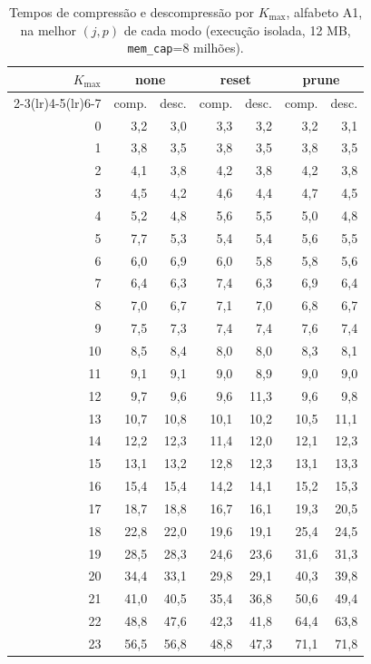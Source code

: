 \begin{table}[H]
\centering
\small
\caption{Tempos de compress\~ao e descompress\~ao por $K_{\max}$, alfabeto A1, na melhor $(j,p)$ de cada modo (execu\c{c}\~ao isolada, 12 MB, \texttt{mem\_cap}=8 milh\~oes).}
\label{tab:times-A1}
\begin{tabular}{rrrrrrr}
\toprule
$K_{\max}$ & \multicolumn{2}{c}{none} & \multicolumn{2}{c}{reset} & \multicolumn{2}{c}{prune} \\
\cmidrule(lr){2-3}\cmidrule(lr){4-5}\cmidrule(lr){6-7}
 & comp. & desc. & comp. & desc. & comp. & desc. \\
\midrule
0 & 3,2 & 3,0 & 3,3 & 3,2 & 3,2 & 3,1 \\
1 & 3,8 & 3,5 & 3,8 & 3,5 & 3,8 & 3,5 \\
2 & 4,1 & 3,8 & 4,2 & 3,8 & 4,2 & 3,8 \\
3 & 4,5 & 4,2 & 4,6 & 4,4 & 4,7 & 4,5 \\
4 & 5,2 & 4,8 & 5,6 & 5,5 & 5,0 & 4,8 \\
5 & 7,7 & 5,3 & 5,4 & 5,4 & 5,6 & 5,5 \\
6 & 6,0 & 6,9 & 6,0 & 5,8 & 5,8 & 5,6 \\
7 & 6,4 & 6,3 & 7,4 & 6,3 & 6,9 & 6,4 \\
8 & 7,0 & 6,7 & 7,1 & 7,0 & 6,8 & 6,7 \\
9 & 7,5 & 7,3 & 7,4 & 7,4 & 7,6 & 7,4 \\
10 & 8,5 & 8,4 & 8,0 & 8,0 & 8,3 & 8,1 \\
11 & 9,1 & 9,1 & 9,0 & 8,9 & 9,0 & 9,0 \\
12 & 9,7 & 9,6 & 9,6 & 11,3 & 9,6 & 9,8 \\
13 & 10,7 & 10,8 & 10,1 & 10,2 & 10,5 & 11,1 \\
14 & 12,2 & 12,3 & 11,4 & 12,0 & 12,1 & 12,3 \\
15 & 13,1 & 13,2 & 12,8 & 12,3 & 13,1 & 13,3 \\
16 & 15,4 & 15,4 & 14,2 & 14,1 & 15,2 & 15,3 \\
17 & 18,7 & 18,8 & 16,7 & 16,1 & 19,3 & 20,5 \\
18 & 22,8 & 22,0 & 19,6 & 19,1 & 25,4 & 24,5 \\
19 & 28,5 & 28,3 & 24,6 & 23,6 & 31,6 & 31,3 \\
20 & 34,4 & 33,1 & 29,8 & 29,1 & 40,3 & 39,8 \\
21 & 41,0 & 40,5 & 35,4 & 36,8 & 50,6 & 49,4 \\
22 & 48,8 & 47,6 & 42,3 & 41,8 & 64,4 & 63,8 \\
23 & 56,5 & 56,8 & 48,8 & 47,3 & 71,1 & 71,8 \\

\end{tabular}
\end{table}
